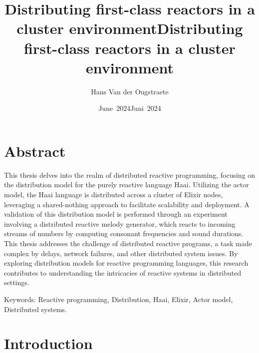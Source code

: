 \documentclass[a4paper]{book}
\title{Distributing first-class reactors in a cluster environment}
\author{Hans Van der Ougstraete}
\date{June~2024}
\begin{document}
\frontmatter
\maketitle%

\title{Distributing first-class reactors in a cluster environment}
%
\date{Juni~2024}%
%
\maketitle%

\chapter{Abstract}
This thesis delves into the realm of distributed reactive programming, focusing on the distribution model for the purely reactive language Haai. Utilizing the actor model, the Haai language is distributed across a cluster of Elixir nodes, leveraging a shared-nothing approach to facilitate scalability and deployment. A validation of this distribution model is performed through an experiment involving a distributed reactive melody generator, which reacts to incoming streams of numbers by computing consonant frequencies and sound durations. This thesis addresses the challenge of distributed reactive programs, a task made complex by delays, network failures, and other distributed system issues. By exploring distribution models for reactive programming languages, this research contributes to understanding the intricacies of reactive systems in distributed settings.

Keywords: Reactive programming, Distribution, Haai, Elixir, Actor model, Distributed systems.


\tableofcontents%

\mainmatter%
\chapter{Introduction}
\end{document}
